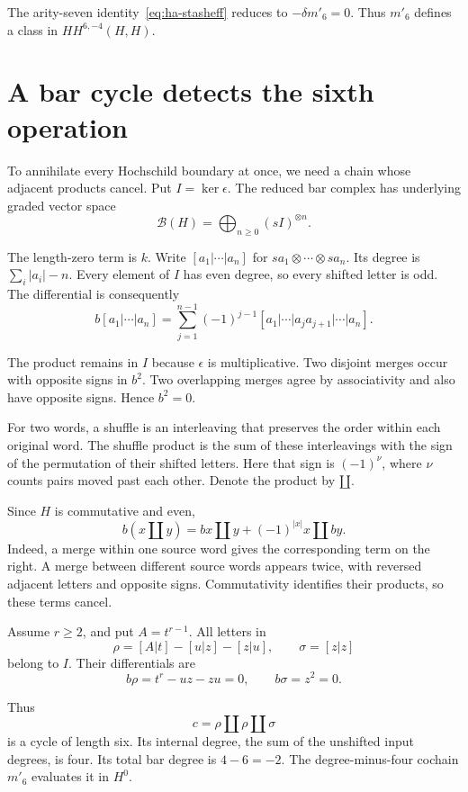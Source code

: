 The arity-seven identity~\eqref{eq:ha-stasheff} reduces to
$-\delta m'_6=0$. Thus $m'_6$ defines a class in $HH^{6,-4}(H,H)$.

\section{A bar cycle detects the sixth operation}
\label{sec:ha-bar-pairing}

To annihilate every Hochschild boundary at once, we need a chain
whose adjacent products cancel. Put $I=\ker\epsilon$.
The reduced bar complex has underlying graded vector space
\[
 \mathcal B(H)=\bigoplus_{n\geq0}(sI)^{\otimes n}.
\]

The length-zero term is $k$. Write
$[a_1|\cdots|a_n]$ for $sa_1\otimes\cdots\otimes sa_n$.
Its degree is $\sum_i|a_i|-n$.
Every element of $I$ has even degree, so every shifted letter is odd.
The differential is consequently
\begin{equation}\label{eq:ha-bar-differential}
 b[a_1|\cdots|a_n]
 =\sum_{j=1}^{n-1}(-1)^{j-1}
 [a_1|\cdots|a_ja_{j+1}|\cdots|a_n].
\end{equation}

The product remains in $I$ because $\epsilon$ is multiplicative.
Two disjoint merges occur with opposite signs in $b^2$.
Two overlapping merges agree by associativity and also have opposite
signs. Hence $b^2=0$.

For two words, a shuffle is an interleaving that preserves the order
within each original word. The shuffle product is the sum of these
interleavings with the sign of the permutation of their shifted letters.
Here that sign is $(-1)^\nu$, where $\nu$ counts pairs moved past
each other. Denote the product by $\amalg$.

Since $H$ is commutative and even,
\[
 b(x\amalg y)=bx\amalg y+(-1)^{|x|}x\amalg by.
\]
Indeed, a merge within one source word gives the corresponding
term on the right. A merge between different source words appears
twice, with reversed adjacent letters and opposite signs.
Commutativity identifies their products, so these terms cancel.

Assume $r\geq2$, and put $A=t^{r-1}$. All letters in
\[
 \rho=[A|t]-[u|z]-[z|u],\qquad \sigma=[z|z]
\]
belong to $I$. Their differentials are
\[
 b\rho=t^r-uz-zu=0,\qquad b\sigma=z^2=0.
\]

Thus
\begin{equation}\label{eq:ha-detecting-chain}
 c=\rho\amalg\rho\amalg\sigma
\end{equation}
is a cycle of length six. Its internal degree, the sum of the
unshifted input degrees, is four. Its total bar degree is $4-6=-2$.
The degree-minus-four cochain $m'_6$ evaluates it in $H^0$.

